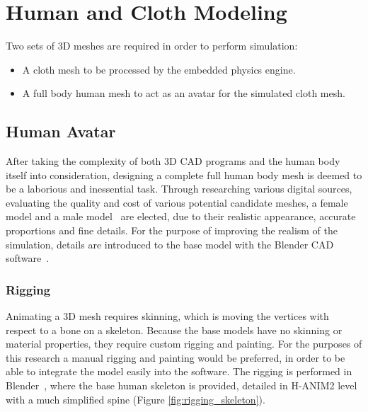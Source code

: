 \chapter{Human and Cloth Modeling}
\label{chapter_3d_model}

Two sets of 3D meshes are required in order to perform simulation: 
\begin{itemize}
\item A cloth mesh to be processed by the embedded physics engine.
\item A full body human mesh to act as an avatar for the simulated cloth mesh.
\end{itemize}

\section{Human Avatar}
\label{section_human_avatar}


After taking the complexity of both 3D CAD programs and the human body itself into consideration, designing a complete full human body mesh is deemed to be a laborious and inessential task. Through researching various digital sources, evaluating the quality and cost of various potential candidate meshes, a female~\cite{Mmava2012} model and a male model~\cite{Gomer2013} are elected, due to their realistic appearance, accurate proportions and fine details. For the purpose of improving the realism of the simulation, details are introduced to the base model with the Blender CAD software~\cite{Blender}.  

\subsection{Rigging}

Animating a 3D mesh requires skinning, which is moving the vertices with respect to a bone on a skeleton. Because the base models have no skinning or material properties, they require custom rigging and painting. For the purposes of this research a manual rigging and painting would be preferred, in order to be able to integrate the model easily into the software. The rigging is performed in Blender~\cite{Blender}, where the base human skeleton is provided, detailed in H-ANIM2 level with a much simplified spine (Figure \ref{fig:rigging_skeleton}). 

